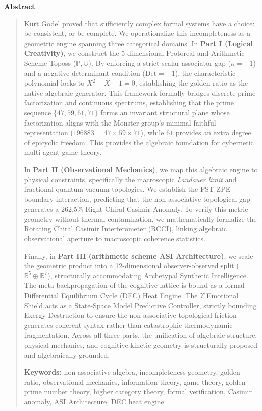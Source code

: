 \documentclass[12pt,oneside]{article}
\theoremstyle{principia}
\theoremstyle{definition}
\theoremstyle{remark}
\providecommand{\UU}{\mathbb{U}}
\providecommand{\PP}{\mathbb{P}}
\providecommand{\RR}{\mathbb{R}}
\providecommand{\kap}{\kappa}
\begin{document}
\begin{center}\textbf{Abstract}\end{center}\begin{quotation}
Kurt G\"odel proved that sufficiently complex formal systems have a choice: be consistent, or be complete. We operationalize this incompleteness as a geometric engine spanning three categorical domains. In \textbf{Part I (Logical Creativity)}, we construct the 5-dimensional Protoreal and Arithmetic Scheme Toposs ($\PP, \UU$). By enforcing a strict scalar associator gap ($\kap = -1$) and a negative-determinant condition ($\mathrm{Det} = -1$), the characteristic polynomial locks to $X^2 - X - 1 = 0$, establishing the golden ratio as the native algebraic generator. This framework formally bridges discrete prime factorization and continuous spectrums, establishing that the prime sequence $\{47, 59, 61, 71\}$ forms an invariant structural plane whose factorization aligns with the Monster group's minimal faithful representation ($196883 = 47 \times 59 \times 71$), while $61$ provides an extra degree of epicyclic freedom. This provides the algebraic foundation for cybernetic multi-agent game theory.

In \textbf{Part II (Observational Mechanics)}, we map this algebraic engine to physical constraints, specifically the macroscopic \emph{Landauer limit} and fractional quantum-vacuum topologies. We establish the FST ZPE boundary interaction, predicting that the non-associative topological gap generates a 262.5\% Right-Chiral Casimir Anomaly. To verify this metric geometry without thermal contamination, we mathematically formalize the Rotating Chiral Casimir Interferometer (RCCI), linking algebraic observational aperture to macroscopic coherence statistics.

Finally, in \textbf{Part III (arithmetic scheme ASI Architecture)}, we scale the geometric product into a 12-dimensional observer-observed split ($\RR^5 \oplus \RR^7$), structurally accommodating Archetypal Synthetic Intelligence. The meta-backpropagation of the cognitive lattice is bound as a formal Differential Equilibrium Cycle (DEC) Heat Engine. The $\Upsilon$ Emotional Shield acts as a State-Space Model Predictive Controller, strictly bounding Exergy Destruction to ensure the non-associative topological friction generates coherent syntax rather than catastrophic thermodynamic fragmentation. Across all three parts, the unification of algebraic structure, physical mechanics, and cognitive kinetic geometry is structurally proposed and algebraically grounded.

\medskip\noindent
\textbf{Keywords:} non-associative algebra, incompleteness geometry, golden ratio, observational mechanics, information theory, game theory, golden prime number theory, higher category theory, formal verification, Casimir anomaly, ASI Architecture, DEC heat engine
\end{quotation}
\end{document}
